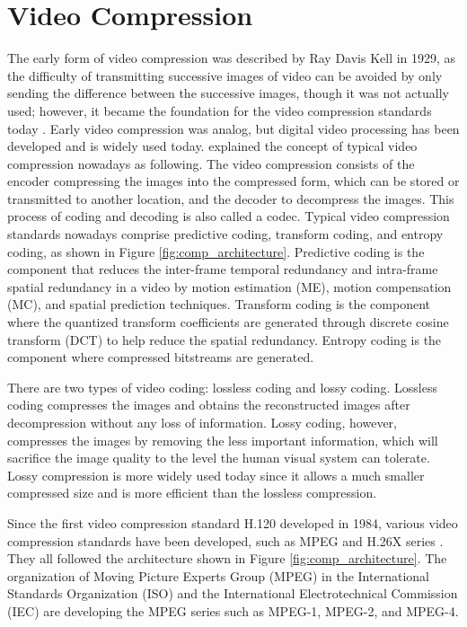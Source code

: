 \section{Video Compression}
\label{sec:introduction/section_b}

The early form of video compression was described by Ray Davis Kell in 1929, as the difficulty of transmitting successive images of video can be avoided by only sending the difference between the successive images, though it was not actually used; however, it became the foundation for the video compression standards today \cite{jacobs_brief_2009}. Early video compression was analog, but digital video processing has been developed and is widely used today. \citeauthor{zhang_overview_2019} \cite{zhang_overview_2019} explained the concept of typical video compression nowadays as following. The video compression consists of the encoder compressing the images into the compressed form, which can be stored or transmitted to another location, and the decoder to decompress the images. This process of coding and decoding is also called a codec. Typical video compression standards nowadays comprise predictive coding, transform coding, and entropy coding, as shown in Figure \ref{fig:comp_architecture}. Predictive coding is the component that reduces the inter-frame temporal redundancy and intra-frame spatial redundancy in a video by motion estimation (ME), motion compensation (MC), and spatial prediction techniques. Transform coding is the component where the quantized transform coefficients are generated through discrete cosine transform (DCT) to help reduce the spatial redundancy. Entropy coding is the component where compressed bitstreams are generated.



There are two types of video coding: lossless coding and lossy coding. Lossless coding compresses the images and obtains the reconstructed images after decompression without any loss of information. Lossy coding, however, compresses the images by removing the less important information, which will sacrifice the image quality to the level the human visual system can tolerate. Lossy compression is more widely used today since it allows a much smaller compressed size and is more efficient than the lossless compression.

Since the first video compression standard H.120 developed in 1984, various video compression standards have been developed, such as MPEG and H.26X series \cite{zhang_overview_2019}. They all followed the architecture shown in Figure \ref{fig:comp_architecture}. The organization of Moving Picture Experts Group (MPEG) in the International Standards Organization (ISO) and the International Electrotechnical Commission (IEC) are developing the MPEG series such as MPEG-1, MPEG-2, and MPEG-4.

